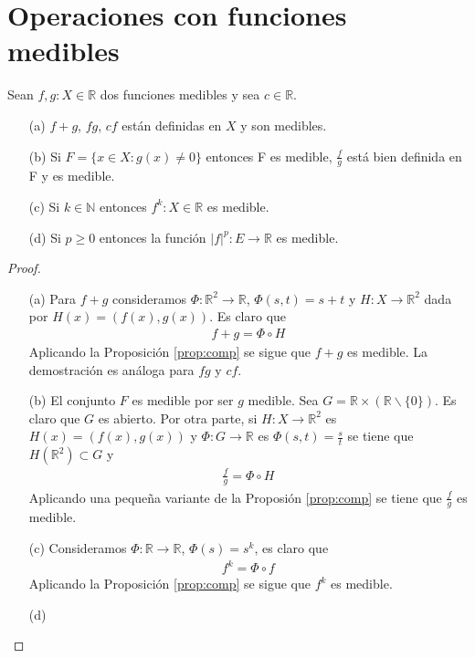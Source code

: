 \section{Operaciones con funciones medibles}
\begin{prop}
    Sean $f,g: X \in \mathbb{R}$ dos funciones medibles y sea $c \in \mathbb{R}$.
    \begin{enumerate}
        \item[(a)] $f+g$, $fg$, $cf$ están definidas en $X$ y son medibles.
        \item[(b)] Si $F = \{ x \in X : g(x) \not = 0 \}$ entonces F es medible, $\frac{f}{g}$ está bien definida en F y es medible.
        \item[(c)] Si $k \in \mathbb{N}$ entonces $f^k: X \in \mathbb{R}$ es medible.
        \item[(d)] Si $p \ge 0$ entonces la función $|f|^p: E \longrightarrow \mathbb{R}$ es medible.
    \end{enumerate}
\end{prop}
\begin{proof}
    \begin{enumerate}
        \item[(a)] Para $f + g$ consideramos $\Phi: \mathbb{R}^2 \longrightarrow \mathbb{R}$, $\Phi(s,t) = s + t$ y $H: X \longrightarrow \mathbb{R}^2$ dada por $H(x) = (f(x), g(x))$. Es claro que
              \begin{align*}
                  f + g = \Phi \circ{} H
              \end{align*}
              Aplicando la Proposición \ref{prop:comp} se sigue que $f + g$ es medible. La demostración es análoga para $fg$ y $cf$.
        \item[(b)] El conjunto $F$ es medible por ser $g$ medible. Sea $G = \mathbb{R} \times (\mathbb{R} \backslash \{0\})$. Es claro que $G$ es abierto. Por otra parte, si $H: X \longrightarrow \mathbb{R}^2$ es $H(x) = (f(x),g(x))$ y $\Phi:G \longrightarrow \mathbb{R}$ es $\Phi(s,t) = \frac{s}{t}$ se tiene que $H(\mathbb{R}^2) \subset G$ y
              \begin{align*}
                  \frac{f}{g} = \Phi \circ{} H
              \end{align*}
              Aplicando una pequeña variante de la Proposión \ref{prop:comp} se tiene que $\frac{f}{g}$ es medible.
        \item[(c)] Consideramos $\Phi: \mathbb{R} \longrightarrow \mathbb{R}$, $\Phi(s) = s^k$, es claro que
              \begin{align*}
                  f^k = \Phi \circ{} f
              \end{align*}
              Aplicando la Proposición \ref{prop:comp} se sigue que $f^k$ es medible.
        \item[(d)]
    \end{enumerate}
\end{proof}
